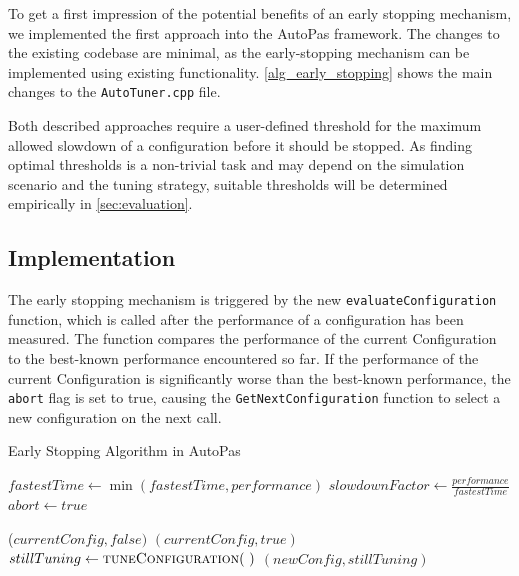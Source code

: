 \documentclass[conference]{IEEEtran}
\begin{document}
To get a first impression of the potential benefits of an early stopping mechanism, we implemented the first approach into the AutoPas framework. The changes to the existing codebase are minimal, as the early-stopping mechanism can be implemented using existing functionality. \autoref{alg_early_stopping} shows the main changes to the \texttt{AutoTuner.cpp} file.

Both described approaches require a user-defined threshold for the maximum allowed slowdown of a configuration before it should be stopped. As finding optimal thresholds is a non-trivial task and may depend on the simulation scenario and the tuning strategy, suitable thresholds will be determined empirically in \autoref{sec:evaluation}.

\subsection{Implementation}
The early stopping mechanism is triggered by the new \texttt{evaluateConfiguration} function, which is called after the performance of a configuration has been measured. The function compares the performance of the current Configuration to the best-known performance encountered so far. If the performance of the current Configuration is significantly worse than the best-known performance, the \texttt{abort} flag is set to true, causing the \texttt{GetNextConfiguration} function to select a new configuration on the next call.

\begin{algorithm}[H]
    \small
    \caption{Early Stopping Algorithm in AutoPas}
    \label{alg_early_stopping}
    \begin{algorithmic}[1]
        \State $fastestTime \gets \min(fastestTime, performance)$
        \State $slowdownFactor \gets \frac{performance}{fastestTime}$
        \State $abort \gets true$
        \EndIf
        \EndProcedure

        \vspace{0.5em}

        \State \Return ($currentConfig, false)$
            \State \Return $(currentConfig, true)$
            \Else
            \State $stillTuning \gets \Call{tuneConfiguration}{~}$
            \State \Return $(newConfig, stillTuning)$
        \EndIf
        \EndProcedure
    \end{algorithmic}

\end{algorithm}
\end{document}
